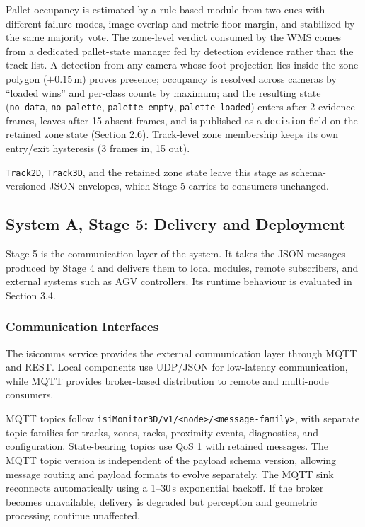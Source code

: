 \documentclass[9pt,a4paper,twocolumn]{rho-class/rho}
\begin{document}
Pallet occupancy is estimated by a rule-based module from two cues with different failure modes, image overlap and metric floor margin, and stabilized by the same majority vote. The zone-level verdict consumed by the WMS comes from a dedicated pallet-state manager fed by detection evidence rather than the track list. A detection from any camera whose foot projection lies inside the zone polygon ($\pm 0.15$\,m) proves presence; occupancy is resolved across cameras by ``loaded wins'' and per-class counts by maximum; and the resulting state (\texttt{no\_data}, \texttt{no\_palette}, \texttt{palette\_empty}, \texttt{palette\_loaded}) enters after 2 evidence frames, leaves after 15 absent frames, and is published as a \texttt{decision} field on the retained zone state (Section 2.6). Track-level zone membership keeps its own entry/exit hysteresis (3 frames in, 15 out).

\texttt{Track2D}, \texttt{Track3D}, and the retained zone state leave this stage as schema-versioned JSON envelopes, which Stage 5 carries to consumers unchanged.

\subsection{System A, Stage 5: Delivery and Deployment}

Stage 5 is the communication layer of the system. It takes the JSON messages produced by Stage 4 and delivers them to local modules, remote subscribers, and external systems such as AGV controllers. Its runtime behaviour is evaluated in Section 3.4.

\subsubsection{Communication Interfaces}

The isicomms service provides the external communication layer through MQTT and REST. Local components use UDP/JSON for low-latency communication, while MQTT provides broker-based distribution to remote and multi-node consumers.

MQTT topics follow \texttt{isiMonitor3D/v1/<node>/<message-family>}, with separate topic families for tracks, zones, racks, proximity events, diagnostics, and configuration. State-bearing topics use QoS 1 with retained messages. The MQTT topic version is independent of the payload schema version, allowing message routing and payload formats to evolve separately. The MQTT sink reconnects automatically using a 1--30\,s exponential backoff. If the broker becomes unavailable, delivery is degraded but perception and geometric processing continue unaffected.
\end{document}
